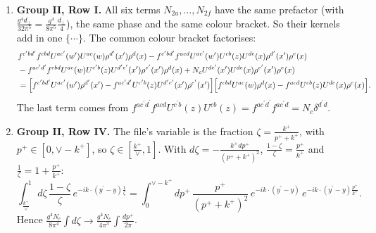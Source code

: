 \documentclass[10pt]{article}
\numberwithin{equation}{section}
\begin{document}
\begin{enumerate}
\begin{itemize}
\item The first and second parts have the same phase and the same denominator, so they are written as one integral. The $(x^{\prime}-y^{\prime})$ piece of the second part joins the bracket of the first part. Its $(x^{\prime}-z)$ piece, with the colour factor at $q=z$, keeps the sign $+\frac{p^{+}}{k^{+2}}$.
\item The third part is kept as it is.
\end{itemize}
\item \textbf{Group II, Row I.} All six terms $N_{2a},\dots,N_{2f}$ have the same prefactor (with $\frac{g^{4}d_{\perp}}{32\pi^{5}}=\frac{g^{4}}{8\pi^{5}}\frac{d_{\perp}}{4}$), the same phase and the same colour bracket. So their kernels add in one $\{\cdots\}$. The common colour bracket factorises:
\begin{align}
&f^{c^{\prime}bd^{\prime}}f^{cbd}U^{ac^{\prime}}(w^{\prime})U^{ac}(w)\rho^{d^{\prime}}(x^{\prime})\rho^{d}(x)-f^{c^{\prime}bd^{\prime}}f^{acd}U^{ac^{\prime}}(w^{\prime})U^{cb}(z)U^{de}(x)\rho^{d^{\prime}}(x^{\prime})\rho^{e}(x)\notag\\
&-f^{ac^{\prime}d^{\prime}}f^{cbd}U^{ac}(w)U^{c^{\prime}b}(z)U^{d^{\prime}e^{\prime}}(x^{\prime})\rho^{e^{\prime}}(x^{\prime})\rho^{d}(x)+N_{c}U^{de^{\prime}}(x^{\prime})U^{de}(x)\rho^{e^{\prime}}(x^{\prime})\rho^{e}(x)\notag\\
&=\Big[f^{c^{\prime}bd^{\prime}}U^{ac^{\prime}}(w^{\prime})\rho^{d^{\prime}}(x^{\prime})-f^{ac^{\prime}d^{\prime}}U^{c^{\prime}b}(z)U^{d^{\prime}e^{\prime}}(x^{\prime})\rho^{e^{\prime}}(x^{\prime})\Big]\Big[f^{cbd}U^{ac}(w)\rho^{d}(x)-f^{acd}U^{cb}(z)U^{de}(x)\rho^{e}(x)\Big].
\end{align}
The last term comes from $f^{ac^{\prime}d^{\prime}}f^{acd}U^{c^{\prime}b}(z)U^{cb}(z)=f^{ac^{\prime}d^{\prime}}f^{ac^{\prime}d}=N_{c}\delta^{d^{\prime}d}$.
\item \textbf{Group II, Row IV.} The file's variable is the fraction $\zeta=\frac{k^{+}}{p^{+}+k^{+}}$, with $p^{+}\in[0,\vee-k^{+}]$, so $\zeta\in[\frac{k^{+}}{\vee},1]$. With $d\zeta=-\frac{k^{+}dp^{+}}{(p^{+}+k^{+})^{2}}$, $\frac{1-\zeta}{\zeta}=\frac{p^{+}}{k^{+}}$ and $\frac{1}{\zeta}=1+\frac{p^{+}}{k^{+}}$:
\begin{equation}
\int_{\frac{k^{+}}{\vee}}^{1}d\zeta\,\frac{1-\zeta}{\zeta}\,e^{-ik\cdot(y^{\prime}-y)\frac{1}{\zeta}}=\int_{0}^{\vee-k^{+}}dp^{+}\,\frac{p^{+}}{(p^{+}+k^{+})^{2}}\,e^{-ik\cdot(y^{\prime}-y)}\,e^{-ik\cdot(y^{\prime}-y)\frac{p^{+}}{k^{+}}}.
\end{equation}
Hence $\frac{g^{4}N_{c}}{8\pi^{4}}\int d\zeta\to\frac{g^{4}N_{c}}{4\pi^{3}}\int\frac{dp^{+}}{2\pi}$.
\end{enumerate}
\end{document}
